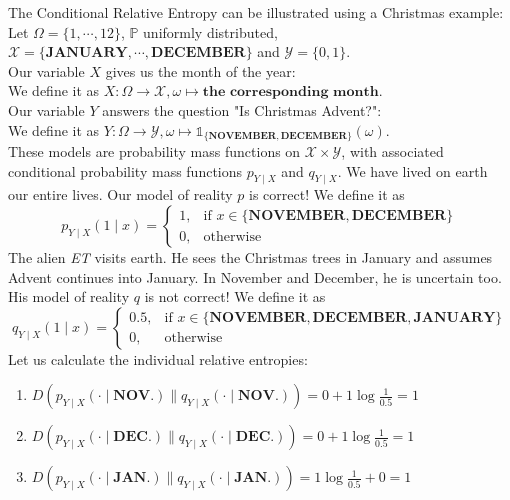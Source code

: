 \begin{example}
    The Conditional Relative Entropy can be illustrated using a Christmas example: \\
    Let $\Omega = \{1, \cdots, 12\}$, $\mathds{P}$ uniformly distributed, \\
    $\mathcal{X} = \{\textbf{JANUARY}, \cdots, \textbf{DECEMBER}\}$ and
    $\mathcal{Y} = \{0, 1\}$. \\
    Our variable $X$ gives us the month of the year: \\
    We define it as $X: \Omega \rightarrow \mathcal{X}, \omega \mapsto \textbf{the corresponding month}$. \\
    Our variable $Y$ answers the question "Is Christmas Advent?": \\
    We define it as $Y: \Omega \rightarrow \mathcal{Y}, \omega \mapsto \mathds{1}_{\{\textbf{NOVEMBER}, \textbf{DECEMBER}\}}(\omega)$. \\
    These models are probability mass functions on $\mathcal{X} \times \mathcal{Y}$,
    with associated conditional probability mass functions $p_{Y \mid X}$ and $q_{Y \mid X}$. 
    We have lived on earth our entire lives. Our model of reality $p$ is correct! 
    We define it as
    \[
        p_{Y \mid X}(1 \mid x) = \begin{cases}
			1, & \text{if $x \in \{\textbf{NOVEMBER}, \textbf{DECEMBER}\}$} \\
            0, & \text{otherwise}
		\end{cases}
    \]
    The alien \textit{ET} visits earth. He sees the Christmas trees in January and assumes Advent continues into January.
    In November and December, he is uncertain too. His model of reality $q$ is not correct! 
    We define it as 
    \[
        q_{Y \mid X}(1 \mid x) = \begin{cases}
			0.5, & \text{if $x \in \{\textbf{NOVEMBER}, \textbf{DECEMBER}, \textbf{JANUARY}\}$} \\
            0, & \text{otherwise}
		\end{cases}
    \]
    Let us calculate the individual relative entropies:
    \begin{enumerate}
        \item $D(p_{Y \mid X}(\cdot \mid \textbf{NOV.}) \| q_{Y \mid X}(\cdot \mid \textbf{NOV.})) = 0 + 1 \log \frac{1}{0.5} = 1$
        \item $D(p_{Y \mid X}(\cdot \mid \textbf{DEC.}) \| q_{Y \mid X}(\cdot \mid \textbf{DEC.})) = 0 + 1 \log \frac{1}{0.5} = 1$
        \item $D(p_{Y \mid X}(\cdot \mid \textbf{JAN.}) \| q_{Y \mid X}(\cdot \mid \textbf{JAN.})) = 1 \log \frac{1}{0.5} + 0 = 1$

\end{enumerate}
\end{example}
